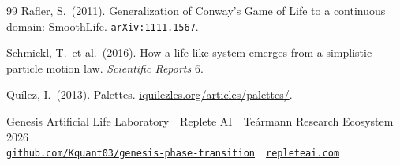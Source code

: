 \documentclass[11pt,a4paper]{article}
\begin{document}
\begin{thebibliography}{99}
Rafler, S.\ (2011).
\newblock Generalization of Conway's Game of Life to a continuous
  domain: SmoothLife. \texttt{arXiv:1111.1567}.

Schmickl, T.\ et al.\ (2016).
\newblock How a life-like system emerges from a simplistic particle
  motion law. \textit{Scientific Reports} 6.

Quílez, I.\ (2013).
\newblock Palettes. \url{iquilezles.org/articles/palettes/}.

\end{thebibliography}

\vspace{18pt}
\begin{center}
\sffamily\footnotesize\color{muted}
Genesis Artificial Life Laboratory \,\textperiodcentered\, Replete AI \,\textperiodcentered\, Teármann Research Ecosystem \,\textperiodcentered\, 2026\\
\href{https://github.com/Kquant03/genesis-phase-transition}{\texttt{github.com/Kquant03/genesis-phase-transition}} \,\textperiodcentered\, \href{https://repleteai.com}{\texttt{repleteai.com}}
\end{center}
\end{document}
